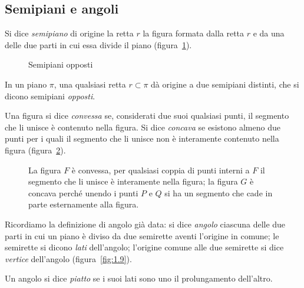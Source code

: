 \subsection{Semipiani e angoli}

\begin{definizione}
Si dice \emph{semipiano} di origine la retta \(r\) la figura formata 
dalla retta \(r\) e da una delle due parti in cui essa divide il piano 
(figura~\ref{fig:1.17}).
\end{definizione}

\begin{inaccessibleblock}
 \begin{figure}[bth]
 \centering
  \caption{Semipiani opposti}\label{fig:1.17}
\end{figure}
\end{inaccessibleblock}
In un piano \({\pi}\), una qualsiasi retta \(r \subset \pi\) dà origine a 
due semipiani distinti, che si dicono semipiani \emph{opposti}.

\begin{definizione}
Una figura si dice \emph{convessa} se, considerati due suoi qualsiasi 
punti, il segmento che li unisce è contenuto nella figura. Si dice 
\emph{concava} se esistono almeno due punti per i quali il segmento 
che li unisce non è interamente contenuto nella figura 
(figura~\ref{fig:1.18}).
\end{definizione}

\begin{inaccessibleblock}
 \begin{figure}[bth]
 \centering 
 \caption{La figura \( F \) è convessa, per qualsiasi coppia di punti 
interni a \( F \) il segmento che li unisce è interamente nella figura; 
la figura \( G \) è concava perché unendo i punti \( P \) e \( Q \) si ha 
un segmento che cade in parte esternamente alla 
figura.}\label{fig:1.18}
\end{figure}
\end{inaccessibleblock}

Ricordiamo la definizione di angolo già data: si dice \emph{angolo} 
ciascuna delle due parti in cui un piano è diviso da due semirette 
aventi l'origine in comune; le semirette si dicono \emph{lati} 
dell'angolo; l'origine comune alle due semirette si dice 
\emph{vertice} dell'angolo (figura~\ref{fig:1.9}).

\begin{definizione}
Un angolo si dice \emph{piatto} se i suoi lati sono uno il 
prolungamento dell'altro.
\end{definizione}

